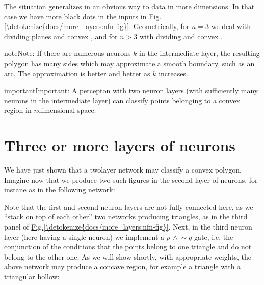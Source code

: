\documentclass[letterpaper,10pt,english]{jupyterBook}
\begin{document}
\sphinxAtStartPar
The situation generalizes in an obvious way to data in more dimensions. In that case we have more black dots in the inputs in  \hyperref[\detokenize{docs/more_layers:nfn-fig}]{Fig.\@ \ref{\detokenize{docs/more_layers:nfn-fig}}}. Geometrically, for \(n=3\) we deal with dividing planes and convex , and for \(n>3\) with dividing  and convex .

\begin{sphinxadmonition}{note}{Note:}
\sphinxAtStartPar
If there are numerous neurons \(k\) in the intermediate layer, the resulting polygon has many sides which may approximate a smooth boundary, such as an arc. The approximation is better and better as \(k\) increases.
\end{sphinxadmonition}

\begin{sphinxadmonition}{important}{Important:}
\sphinxAtStartPar
A percepton with two neuron layers (with sufficiently many neurons in the intermediate layer) can classify points belonging to a convex region in \(n\)\sphinxhyphen{}dimensional space.
\end{sphinxadmonition}


\section{Three or more layers of neurons}
\label{\detokenize{docs/more_layers:three-or-more-layers-of-neurons}}
\sphinxAtStartPar
We have just shown that a two\sphinxhyphen{}layer network may classify a convex polygon. Imagine now that we produce two such figures in the second layer of neurons, for instane as in the following network:

\noindent{}

\sphinxAtStartPar
Note that the first and second neuron layers are not fully connected here, as we “stack on top of each other” two networks producing triangles, as in the third panel of \hyperref[\detokenize{docs/more_layers:nfn-fig}]{Fig.\@ \ref{\detokenize{docs/more_layers:nfn-fig}}}. Next, in the third neuron layer (here having a single neuron) we implement a \(p \,\wedge \!\sim\!q\) gate, i.e. the conjunction of the conditions that the points belong to one triangle and do not belong to the other one. As we will show shortly, with appropriate weights, the above network may produce a concave region, for example a triangle with a triangular hollow:
\end{document}
